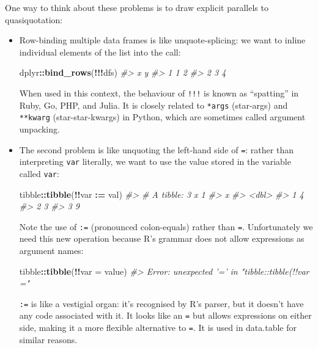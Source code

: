 \documentclass[]{book}
\makeatletter
\newenvironment{Shaded}{\begin{snugshade}}{\end{snugshade}}
\newcommand{\CommentTok}[1]{\textcolor[rgb]{0.37,0.37,0.37}{\textit{#1}}}
\newcommand{\DataTypeTok}[1]{\textcolor[rgb]{0.27,0.27,0.27}{#1}}
\newcommand{\ErrorTok}[1]{\textcolor[rgb]{0.14,0.14,0.14}{\textbf{#1}}}
\newcommand{\KeywordTok}[1]{\textcolor[rgb]{0.27,0.27,0.27}{\textbf{#1}}}
\newcommand{\NormalTok}[1]{#1}
\newcommand{\OperatorTok}[1]{\textcolor[rgb]{0.43,0.43,0.43}{\textbf{#1}}}
\newcommand{\StringTok}[1]{\textcolor[rgb]{0.5,0.5,0.5}{#1}}
\newcommand{\indexc}[1]{\index{#1@\texttt{#1}}}
\makeatother
\begin{document}
One way to think about these problems is to draw explicit parallels to quasiquotation:

\begin{itemize}
\item
  Row-binding multiple data frames is like unquote-splicing: we want to inline
  individual elements of the list into the call:

\begin{Shaded}
\begin{Highlighting}[]
\NormalTok{dplyr}\OperatorTok{::}\KeywordTok{bind_rows}\NormalTok{(}\OperatorTok{!!!}\NormalTok{dfs)}
\CommentTok{#>   x y}
\CommentTok{#> 1 1 2}
\CommentTok{#> 2 3 4}
\end{Highlighting}
\end{Shaded}

  When used in this context, the behaviour of \texttt{!!!} is known as ``spatting'' in
  Ruby, Go, PHP, and Julia. It is closely related to \texttt{*args} (star-args) and
  \texttt{**kwarg} (star-star-kwargs) in Python, which are sometimes called argument
  unpacking.
\item
  The second problem is like unquoting the left-hand side of \texttt{=}: rather
  than interpreting \texttt{var} literally, we want to use the value stored in the
  variable called \texttt{var}:

\begin{Shaded}
\begin{Highlighting}[]
\NormalTok{tibble}\OperatorTok{::}\KeywordTok{tibble}\NormalTok{(}\OperatorTok{!!}\NormalTok{var }\OperatorTok{:}\ErrorTok{=}\StringTok{ }\NormalTok{val)}
\CommentTok{#> # A tibble: 3 x 1}
\CommentTok{#>       x}
\CommentTok{#>   <dbl>}
\CommentTok{#> 1     4}
\CommentTok{#> 2     3}
\CommentTok{#> 3     9}
\end{Highlighting}
\end{Shaded}

  Note the use of \texttt{:=} (pronounced colon-equals) rather than \texttt{=}. Unfortunately
  we need this new operation because R's grammar does not allow expressions as
  argument names:

\begin{Shaded}
\begin{Highlighting}[]
\NormalTok{tibble}\OperatorTok{::}\KeywordTok{tibble}\NormalTok{(}\OperatorTok{!!}\DataTypeTok{var =}\NormalTok{ value)}
\CommentTok{#> Error: unexpected '=' in "tibble::tibble(!!var ="}
\end{Highlighting}
\end{Shaded}

  \texttt{:=} is like a vestigial organ: it's recognised by R's parser, but it
  doesn't have any code associated with it. It looks like an \texttt{=} but allows
  expressions on either side, making it a more flexible alternative to \texttt{=}.
  It is used in data.table for similar reasons.
  \indexc{:=}
\end{itemize}
\end{document}

